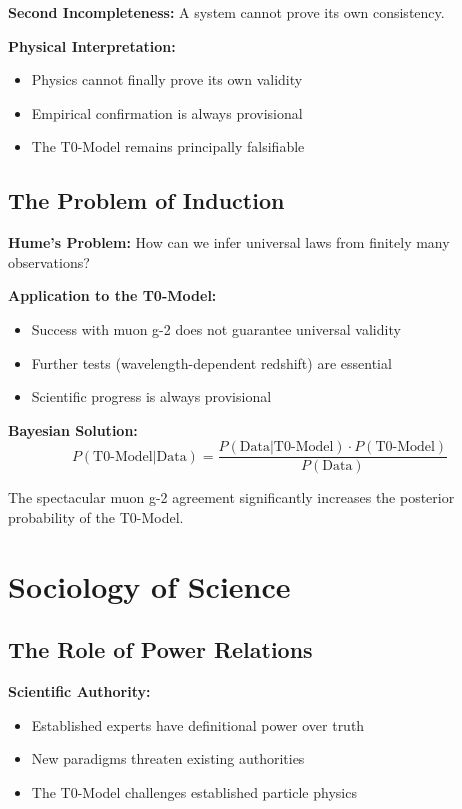 \documentclass[12pt,a4paper]{report}
\begin{document}
	\textbf{Second Incompleteness:}
	A system cannot prove its own consistency.
	
	\textbf{Physical Interpretation:}
	\begin{itemize}
		\item Physics cannot finally prove its own validity
		\item Empirical confirmation is always provisional
		\item The T0-Model remains principally falsifiable
	\end{itemize}
	
	\subsection{The Problem of Induction}\label{subsec:induction_problem}
	
	\textbf{Hume's Problem:}
	How can we infer universal laws from finitely many observations?
	
	\textbf{Application to the T0-Model:}
	\begin{itemize}
		\item Success with muon g-2 does not guarantee universal validity
		\item Further tests (wavelength-dependent redshift) are essential
		\item Scientific progress is always provisional
	\end{itemize}
	
	\textbf{Bayesian Solution:}
	\begin{equation}
		P(\text{T0-Model}|\text{Data}) = \frac{P(\text{Data}|\text{T0-Model}) \cdot P(\text{T0-Model})}{P(\text{Data})}
	\end{equation}
	
	The spectacular muon g-2 agreement significantly increases the posterior probability of the T0-Model.
	
	\section{Sociology of Science}\label{sec:sociology_science}
	
	\subsection{The Role of Power Relations}\label{subsec:power_relations}
	
	\textbf{Scientific Authority:}
	\begin{itemize}
		\item Established experts have definitional power over truth
		\item New paradigms threaten existing authorities
		\item The T0-Model challenges established particle physics
	\end{itemize}
	
\end{document}
